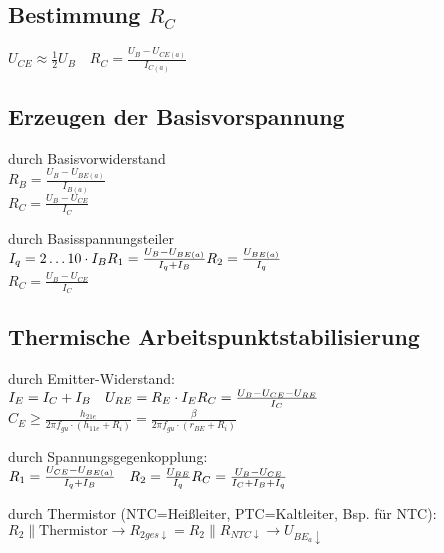 \subsection{Bestimmung \texorpdfstring{$R_C$}{RC}}
$U_{CE}\approx \frac{1}{2}U_B\quad R_C=\frac{U_B-U_{CE(a)}}{I_{C(a)}}$

\subsection{Erzeugen der Basisvorspannung}
    \begin{minipage}{0.5\columnwidth}
        durch Basisvorwiderstand\\
        $R_B=\frac{U_B-U_{BE(a)}}{I_{B(a)}}$\\ %
        $R_C=\frac{U_B-U_{CE}}{I_C}$
    \end{minipage}
    \begin{minipage}{0.5\columnwidth}
    \end{minipage}

    \begin{minipage}{0.5\columnwidth}
        durch Basisspannungsteiler\\
        $I_q=2\dots 10\cdot I_B\\
        R_1=\frac{U_B-U_{BE(a)}}{I_q+I_B}\\
        R_2=\frac{U_{BE(a)}}{I_q}$\\
        $R_C=\frac{U_B-U_{CE}}{I_C}$
    \end{minipage}
    \begin{minipage}{0.5\columnwidth}
    \end{minipage}

\subsection{Thermische Arbeitspunktstabilisierung}
    \begin{minipage}{0.5\columnwidth}
        durch Emitter-Widerstand:\\
        $I_E=I_C+I_B\quad U_{RE}=R_E\cdot I_E\\
        R_C=\frac{U_B-U_{CE}-U_{RE}}{I_C}$\\ %
        $C_E\geq\frac{h_{21e}}{2\pi f_{gu}\cdot(h_{11e}+R_i)}=\frac{\beta}{2\pi f_{gu}\cdot(r_{BE}+R_i)}$ %
    \end{minipage}
    \begin{minipage}{0.5\columnwidth}
        durch Spannungsgegenkopplung:\\
        $R_1=\frac{U_{CE}-U_{BE(a)}}{I_q+I_B}\quad R_2=\frac{U_{BE}}{I_q}\\
        R_C=\frac{U_B-U_{CE}}{I_C+I_B+I_q}$ 
    \end{minipage}
    
    durch Thermistor (NTC=Heißleiter, PTC=Kaltleiter, Bsp. für NTC):\\
    $R_2\parallel\text{Thermistor}\rightarrow R_{2ges\downarrow}=R_2\parallel R_{NTC\downarrow}\rightarrow U_{BE_a\downarrow}$
